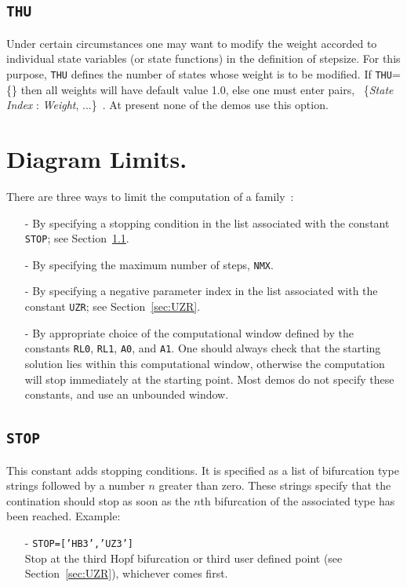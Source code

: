 \documentclass[12pt]{report}
\begin{document}
\subsection{\tt THU}  \label{sec:THU}
Under certain circumstances one may want to modify the weight accorded 
to individual state variables (or state functions) in the definition 
of stepsize.
For this purpose, {\tt THU} defines the number of states whose weight 
is to be modified.
If {\tt THU}=\{\} then all weights will have default value 1.0,
else one must enter pairs,
             ~\{{\it State Index} : {\it Weight}, ...\}~.
At present none of the demos use this option.
\section{ Diagram Limits.} \label{sec:Diagram_limits}

There are three ways to limit the computation of a family~:

\begin{itemize}
\item[-]
By specifying a stopping condition in the list associated 
with the constant {\tt STOP}; see Section~\ref{sec:STOP}. 

\item[-]
By specifying the maximum number of steps, {\tt NMX}.

\item[-]
By specifying a negative parameter index in the list associated 
with the constant {\tt UZR}; see Section~\ref{sec:UZR}. 

\item[-]
By appropriate choice of the computational window 
defined by the constants {\tt RL0}, {\tt RL1}, {\tt A0}, and {\tt A1}.
One should always check that the starting solution lies within
this computational window, otherwise the computation will stop immediately
at the starting point. Most demos do not specify these constants, and
use an unbounded window.
\end{itemize}

\subsection{\tt STOP}  \label{sec:STOP}
This constant adds stopping conditions. It is specified as a list of
bifurcation type strings followed by a number $n$ greater than zero.
These strings specify that the contination should stop as soon as the $n$th
bifurcation of the associated type has been reached.
Example:\\
\begin{itemize}
\item[-] {\tt STOP=['HB3','UZ3']}\\
Stop at the third Hopf bifurcation or third user defined point (see
Section~\ref{sec:UZR}), whichever comes first.
\end{itemize}
\end{document}
